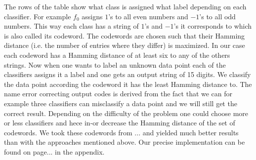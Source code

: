 The rows of the table show what class is assigned what label depending on each classifier. For example $f_0$ assigns $1$'s to all even numbers and $-1$'s to all odd numbers. This way each class has a string of $1$'s and $-1$'s it corresponds to which is also called its codeword. The codewords are chosen such that their Hamming distance (i.e. the number of entries where they differ) is maximized. In our case each codeword has a Hamming distance of at least six to any of the others strings. Now when one wants to label an unknown data point each of the classifiers assigns it a label and one gets an output string of 15 digits. We classify the data point according the codeword it has the least Hamming distance to. The name error correcting output codes is derived from the fact that we can for example three classifiers can misclassify a data point and we will still get the correct result. Depending on the difficulty of the problem one could choose more or less classifiers and hece in-or decrease the Hamming distance of the set of codewords. We took these codewords from ... and yielded much better results than with the approaches mentioned above. Our precise implementation can be found on page... in the appendix. 


